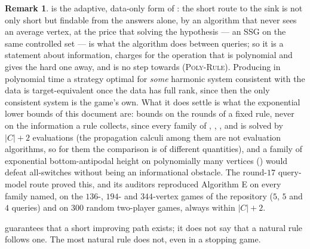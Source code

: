 \documentclass[11pt]{article}
\theoremstyle{plain}
\theoremstyle{definition}
\newtheorem{remark}[theorem]{Remark}
\begin{document}
\begin{remark}\label{rem:eval-queries}
 is the adaptive, data-only form of
: the short route to the sink is not only short but
findable from the answers alone, by an algorithm that never sees an
average vertex, at the price that solving the hypothesis --- an SSG on
the same controlled set --- is what the algorithm does between queries;
so it is a statement about information, charges for the operation that is
polynomial and gives the hard one away, and is no step towards
\textsc{(Poly-Rule)}. Producing in polynomial time a strategy optimal for
\emph{some} harmonic system consistent with the data is target-equivalent
once the data has full rank, since then the only consistent system is the
game's own. What it does settle is what the exponential lower bounds of
this document are: bounds on the rounds of a fixed rule, never on the
information a rule collects, since every family of ,
, , 
and  is solved by $|C|+2$ evaluations (the propagation
calculi among them are not evaluation algorithms, so for them the
comparison is of different quantities), and a family of exponential
bottom-antipodal height on polynomially many vertices
() would defeat all-switches without being an
informational obstacle. The round-$17$ query-model route proved this,
and its auditors reproduced Algorithm E on every family named, on the
$136$-, $194$- and $344$-vertex games of the repository ($5$, $5$ and $4$
queries) and on $300$ random two-player games, always within $|C|+2$.
\end{remark}

 guarantees that a short improving path exists; it
does not say that a natural rule follows one. The most natural rule does
not, even in a stopping game.
\end{document}

